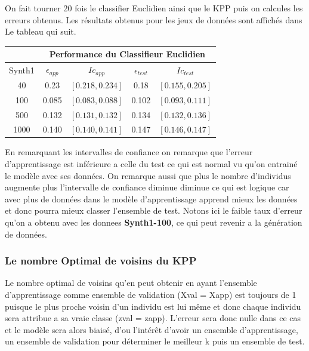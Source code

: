 \documentclass[10pt]{article}
\begin{document}
			On fait tourner 20 fois le classifier Euclidien ainsi que le KPP puis on calcules les erreurs obtenus. Les résultats obtenus pour les jeux de données sont affichés dans Le tableau qui suit.
			\begin{center}		
				\begin{tabular}{ | c | c| c | c | c |}
						\rowcolor{lightgray} 
				   	&  \multicolumn{4}{|c|}{ Performance du  Classifieur Euclidien}\\
					
					\hline
					 Synth1  &  $\epsilon_{app}$ &  $Ic_{app}$&  $\epsilon_{test}$ &  $Ic_{test}$  \\
					\hline
					\multirow{1}{*}{40}   & 0.23  & $[0.218, 0.234]$& 0.18      & 	$[0.155, 0.205]$ \\
															
					\hline
					\multirow{1}{*}{100}      &0.085  &   $[0.083, 0.088  ]$& 0.102     & 	$[0.093, 0.111]$  \\
				
					\hline
					\multirow{1}{*}{500}     & 0.132 &   $[0.131, 0.132]$& 0.134    & 	$[0.132, 0.136]$	\\
				
					\hline
					\multirow{1}{*}{1000}    & 0.140     & $[0.140, 0.141]$ &  0.147   & $[0.146, 0.147]$  	\\
				
					\hline
				\end{tabular}
			\end{center}
		\vspace{1.5mm}
			En remarquant les intervalles de confiance on remarque que l'erreur d'apprentissage est inférieure a celle du test ce qui est normal vu qu'on entrainé le modèle avec ses données. On remarque aussi que plus le nombre d'individus augmente  plus l'intervalle de confiance diminue diminue ce qui est logique car avec plus de données dans le modèle d'apprentissage apprend mieux les données et donc pourra mieux classer l'ensemble de test. Notons ici le faible taux d'erreur qu'on a obtenu avec les donnees \textbf{Synth1-100}, ce qui peut revenir a la génération de données.
			 
				\subsubsection{Le nombre Optimal de voisins du KPP }
				Le nombre optimal de voisins qu'en peut obtenir en ayant l'ensemble d'apprentissage comme ensemble de validation (Xval = Xapp) est toujours de 1 puisque le plus proche voisin d'un individu est lui même et donc chaque individu sera attribue a sa vraie classe (zval = zapp). L'erreur sera donc nulle dans ce cas et le modèle sera alors biaisé, d'ou l'intérêt d'avoir un ensemble d'apprentissage, un ensemble de validation pour déterminer le meilleur k puis un ensemble de test.
			
\end{document}
